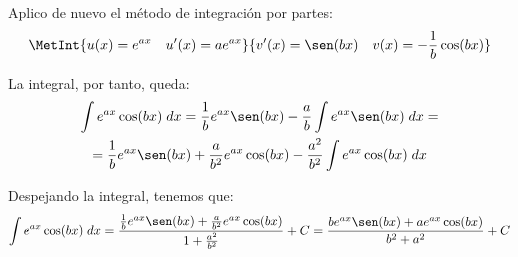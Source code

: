 \begin{ejercicio}
\begin{enumerate}
        Aplico de nuevo el método de integración por partes:
        $$\MetInt{u(x)=e^{ax}\quad u'(x)=ae^{ax}}{v'(x)=\sen (bx)\quad v(x)=-\frac{1}{b}\cos(bx)}$$
        
        La integral, por tanto, queda:
        \begin{multline*}
            \int e^{ax}\cos(bx)\;dx
            = \frac{1}{b}e^{ax}\sen(bx)-\frac{a}{b}\int e^{ax}\sen (bx)\;dx
            =\\=
            \frac{1}{b}e^{ax}\sen(bx)+\frac{a}{b^2}e^{ax}\cos(bx)-\frac{a^2}{b^2}\int e^{ax}\cos(bx)\;dx
        \end{multline*}

        Despejando la integral, tenemos que:
        \begin{equation*}
            \int e^{ax}\cos(bx)\;dx = \frac{\frac{1}{b}e^{ax}\sen(bx)+\frac{a}{b^2}e^{ax}\cos(bx)}{1+\frac{a^2}{b^2}}+C
            = \frac{be^{ax}\sen(bx)+ae^{ax}\cos(bx)}{b^2+a^2}+C
        \end{equation*}
        
    \end{enumerate}
\end{ejercicio}

